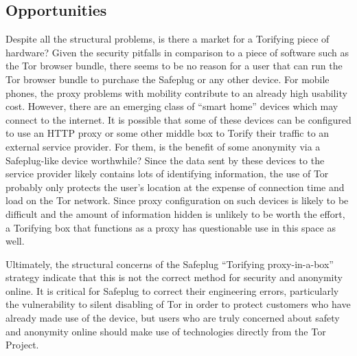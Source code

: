 \documentclass[conference]{IEEEtran}
\begin{document}
\subsection{Opportunities}
Despite all the structural problems, is there a market for a Torifying piece of hardware?  Given the security pitfalls in comparison to a piece of software such as the Tor browser bundle, there seems to be no reason for a user that can run the Tor browser bundle to purchase the Safeplug or any other device.  For mobile phones, the proxy problems with mobility contribute to an already high usability cost.  However, there are an emerging class of ``smart home'' devices which may connect to the internet.  It is possible that some of these devices can be configured to use an HTTP proxy or some other middle box to Torify their traffic to an external service provider.  For them, is the benefit of some anonymity via a Safeplug-like device worthwhile?  Since the data sent by these devices to the service provider likely contains lots of identifying information, the use of Tor probably only protects the user's location at the expense of connection time and load on the Tor network.  Since proxy configuration on such devices is likely to be difficult and the amount of information hidden is unlikely to be worth the effort, a Torifying box that functions as a proxy has questionable use in this space as well.

Ultimately, the structural concerns of the Safeplug ``Torifying proxy-in-a-box'' strategy indicate that this is not the correct method for security and anonymity online.  It is critical for Safeplug to correct their engineering errors, particularly the vulnerability to silent disabling of Tor in order to protect customers who have already made use of the device, but users who are truly concerned about safety and anonymity online should make use of technologies directly from the Tor Project.





\end{document}
